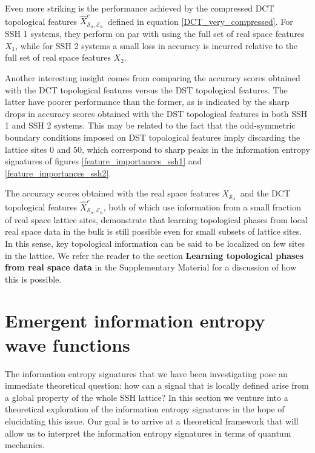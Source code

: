 \documentclass[10pt]{revtex4-1}
\newcommand\xOne{$X_1$}
\newcommand\xTwo{$X_2$}
\newcommand\xSalpha{$X_{\mathcal{S}_\alpha}$}
\newcommand\xcSEalpha{$\hat{X}^c_{\mathcal{S}_\alpha,\mathcal{E}_\alpha}$}
\begin{document}
Even more striking is the performance achieved by the compressed DCT topological features \xcSEalpha\ defined in equation \eqref{DCT_very_compressed}. For SSH 1 systems, they perform on par with using the full set of real space features \xOne, while for SSH 2 systems a small loss in accuracy is incurred relative to the full set of real space features \xTwo.

Another interesting insight comes from comparing the accuracy scores obtained with the DCT topological features versus the  DST topological features. The latter have poorer performance than the former, as is indicated by the sharp drops in accuracy scores obtained with the DST topological features in both SSH 1 and SSH 2 systems. This may be related to the fact that the odd-symmetric boundary conditions imposed on DST topological features imply discarding the lattice sites 0 and $50$, which correspond to sharp peaks in the information entropy signatures of figures \ref{feature_importances_ssh1} and \ref{feature_importances_ssh2}.  

The accuracy scores obtained with the real space features \xSalpha\ and the DCT topological features \xcSEalpha, both of which use information from a small fraction of real space lattice sites, demonstrate that learning topological phases from local real space data in the bulk is still possible even for small subsets of lattice sites. In this sense, key topological information can be said to be localized on few sites in the lattice. We refer the reader to the section \textbf{Learning topological phases from real space data} in the Supplementary Material for a discussion of how this is possible.       

\section{Emergent information entropy wave functions}
\label{emergent_information_entropy_wave_functions}

The information entropy signatures that we have been investigating pose an immediate theoretical question: how can a signal that is locally defined arise from a global property of the whole SSH lattice?    
In this section we venture into a theoretical exploration of the information entropy signatures in the hope of elucidating this issue. Our goal is to arrive at a theoretical framework that will allow us to interpret the information entropy signatures in terms of quantum mechanics.  %
\end{document}
